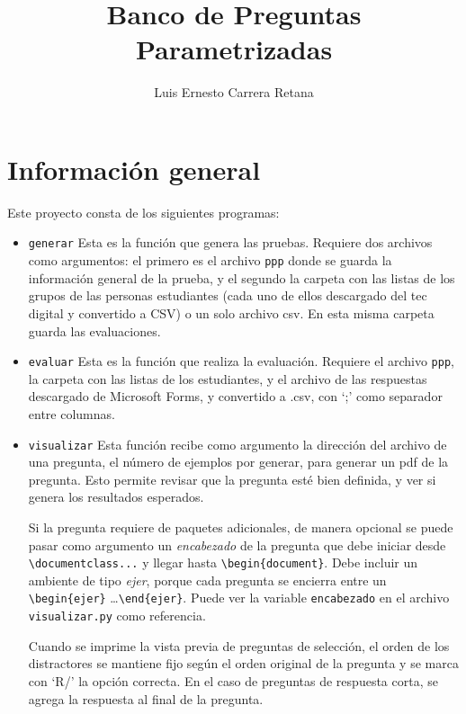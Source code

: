 \documentclass[12pt]{article}
\title{Banco de Preguntas Parametrizadas}
\author{Luis Ernesto Carrera Retana}
\theoremstyle{definition}
\begin{document}
\maketitle

\section{Información general}

Este proyecto consta de los siguientes programas:
\begin{itemize}
  \item \verb|generar| Esta es la función que genera las pruebas. Requiere dos archivos como argumentos: el primero es el archivo \verb|ppp| donde se guarda la información general de la prueba, y el segundo la carpeta con las listas de los grupos de las personas estudiantes (cada uno de ellos descargado del tec digital y convertido a CSV) o un solo archivo csv. En esta misma carpeta guarda las evaluaciones.

  \item \verb|evaluar| Esta es la función que realiza la evaluación. Requiere el archivo \verb|ppp|, la carpeta con las listas de los estudiantes, y el archivo de las respuestas descargado de Microsoft Forms, y convertido a .csv, con `;' como separador entre columnas.

  \item \verb|visualizar| Esta función recibe como argumento la dirección del archivo de una pregunta, el número de ejemplos por generar, para generar un pdf de la pregunta. Esto permite revisar que la pregunta esté bien definida, y ver si genera los resultados esperados.

    Si la pregunta requiere de paquetes adicionales, de manera opcional se puede pasar como argumento un \emph{encabezado} de la pregunta que debe iniciar desde \verb|\documentclass...| y llegar hasta \verb|\begin{document}|. Debe incluir un ambiente de tipo \emph{ejer}, porque cada pregunta se encierra entre un \verb|\begin{ejer}| \dots \verb|\end{ejer}|. Puede ver la variable \verb|encabezado| en el archivo \verb|visualizar.py| como referencia.

    Cuando se imprime la vista previa de preguntas de selecci\'on, el orden de los distractores se mantiene fijo seg\'un el orden original de la pregunta y se marca con `R/' la opci\'on correcta. En el caso de preguntas de respuesta corta, se agrega la respuesta al final de la pregunta.
\end{itemize}
\end{document}
